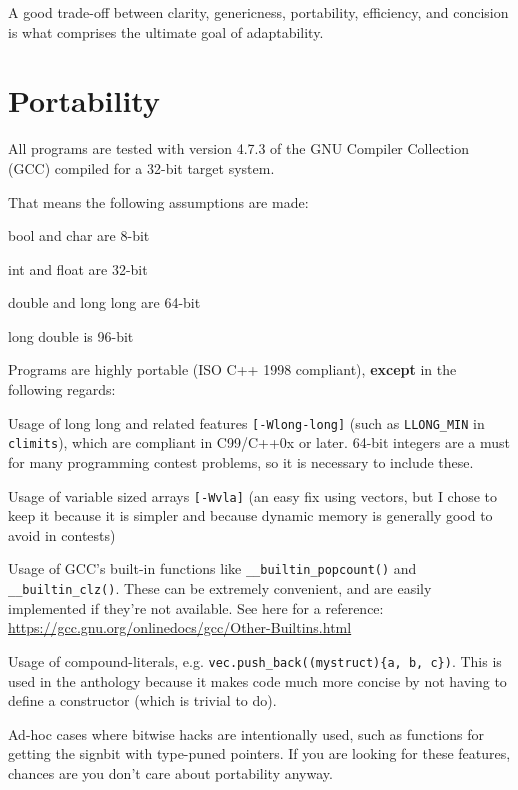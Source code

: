 
A good trade-off between clarity, genericness, portability, efficiency, and concision is what comprises the ultimate goal of adaptability.

\section{Portability}

All programs are tested with version 4.7.3 of the GNU Compiler Collection (GCC) compiled for a 32-bit target system.

That means the following assumptions are made:

\begin{compactitem}
	\item bool and char are 8-bit
	\item int and float are 32-bit
	\item double and long long are 64-bit
	\item long double is 96-bit
\end{compactitem}

Programs are highly portable (ISO C++ 1998 compliant), \textbf{except} in the following regards:

\begin{compactitem}
	\item Usage of long long and related features \texttt{[-Wlong-long]} (such as \texttt{LLONG\_MIN} in \texttt{\textlangle{}climits\textrangle{}}), which are compliant in C99/C++0x or later. 64-bit integers are a must for many programming contest problems, so it is necessary to include these.
	\item Usage of variable sized arrays \texttt{[-Wvla]} (an easy fix using vectors, but I chose to keep it because it is simpler and because dynamic memory is generally good to avoid in contests)
	\item Usage of GCC's built-in functions like \texttt{\_\_builtin\_popcount()} and \texttt{\_\_builtin\_clz()}. These can be extremely convenient, and are easily implemented if they're not available. See here for a reference: \url{https://gcc.gnu.org/onlinedocs/gcc/Other-Builtins.html}
	\item Usage of compound-literals, e.g. \texttt{vec.push\_back((mystruct)\{a, b, c\})}. This is used in the anthology because it makes code much more concise by not having to define a constructor (which is trivial to do).
	\item Ad-hoc cases where bitwise hacks are intentionally used, such as functions for getting the signbit with type-puned pointers. If you are looking for these features, chances are you don't care about portability anyway.
\end{compactitem}


